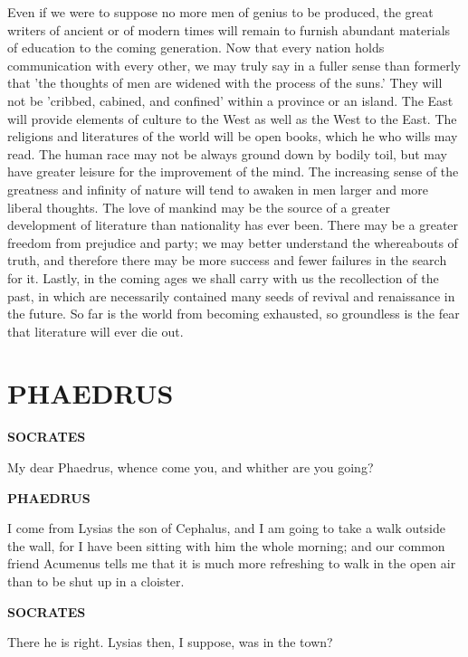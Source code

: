 \documentclass[11pt,letter]{article}
\begin{document}
\par  Even if we were to suppose no more men of genius to be produced, the great writers of ancient or of modern times will remain to furnish abundant materials of education to the coming generation. Now that every nation holds communication with every other, we may truly say in a fuller sense than formerly that 'the thoughts of men are widened with the process of the suns.' They will not be 'cribbed, cabined, and confined' within a province or an island. The East will provide elements of culture to the West as well as the West to the East. The religions and literatures of the world will be open books, which he who wills may read. The human race may not be always ground down by bodily toil, but may have greater leisure for the improvement of the mind. The increasing sense of the greatness and infinity of nature will tend to awaken in men larger and more liberal thoughts. The love of mankind may be the source of a greater development of literature than nationality has ever been. There may be a greater freedom from prejudice and party; we may better understand the whereabouts of truth, and therefore there may be more success and fewer failures in the search for it. Lastly, in the coming ages we shall carry with us the recollection of the past, in which are necessarily contained many seeds of revival and renaissance in the future. So far is the world from becoming exhausted, so groundless is the fear that literature will ever die out.

\par 
\section{
      PHAEDRUS
    }  
\par \textbf{SOCRATES}
\par   My dear Phaedrus, whence come you, and whither are you going?

\par \textbf{PHAEDRUS}
\par   I come from Lysias the son of Cephalus, and I am going to take a walk outside the wall, for I have been sitting with him the whole morning; and our common friend Acumenus tells me that it is much more refreshing to walk in the open air than to be shut up in a cloister.

\par \textbf{SOCRATES}
\par   There he is right. Lysias then, I suppose, was in the town?
\end{document}
